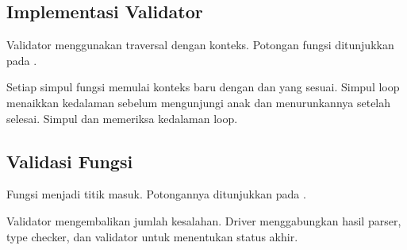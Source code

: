 \subsection{Implementasi Validator}

Validator menggunakan traversal dengan konteks. Potongan fungsi
 ditunjukkan pada .


Setiap simpul fungsi memulai konteks baru dengan
 dan  yang sesuai. Simpul loop
menaikkan kedalaman sebelum mengunjungi anak dan menurunkannya
setelah selesai. Simpul  dan  memeriksa
kedalaman loop.

\subsection{Validasi Fungsi}

Fungsi  menjadi titik masuk. Potongannya
ditunjukkan pada .


Validator mengembalikan jumlah kesalahan. Driver menggabungkan hasil
parser, type checker, dan validator untuk menentukan status akhir.
